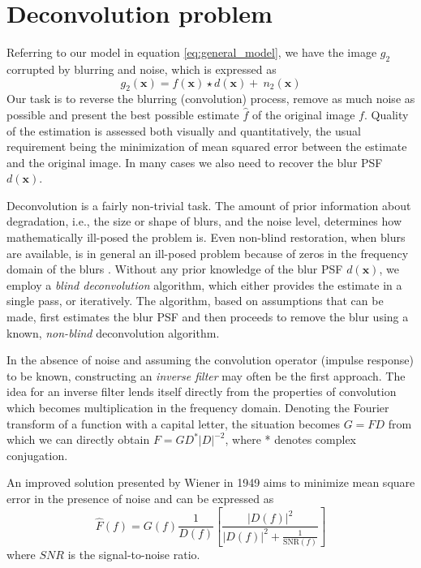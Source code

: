 \documentclass[12pt,notitlepage]{report}
\begin{document}
\section{Deconvolution problem}
\label{sec:the_deconvolution_problem}

Referring to our model in equation \ref{eq:general_model}, we have the image $g_2$ corrupted by blurring and noise, which is expressed as 
\begin{equation}
	\label{eq:deconvolution_problem}
		g_2(\mathbf{x}) = f(\mathbf{x}) \star d(\mathbf{x}) + \ n_2(\mathbf{x}) 
\end{equation}
Our task is to reverse the blurring (convolution) process, remove as much noise as possible and present the best possible estimate $\hat{f}$ of the original image $f$. Quality of the estimation is assessed both visually and quantitatively, the usual requirement being the minimization of mean squared error between the estimate and the original image. In many cases we also need to recover the blur PSF $d(\mathbf{x})$. 

Deconvolution is a fairly non-trivial task. The amount of prior information about degradation, i.e., the size or shape of blurs, and the noise level, determines how mathematically ill-posed the problem is. 
Even non-blind restoration, when blurs are available, is in general an ill-posed problem because of zeros in the frequency domain of the blurs \cite{srou03}. Without any prior knowledge of the blur PSF $d(\mathbf{x})$, we employ a {\em blind deconvolution} algorithm,  which either provides the estimate in a single pass, or iteratively. The algorithm, based on assumptions that can be made, first estimates the blur PSF and then proceeds to remove the blur using a known, {\em non-blind} deconvolution algorithm.  

In the absence of noise and assuming the convolution operator (impulse response) to be known, constructing an {\em inverse filter} may often be the first approach. The idea for an inverse filter lends itself directly from the properties of convolution which becomes multiplication in the frequency domain. Denoting the Fourier transform of a function with a capital letter, the situation becomes $G = FD$ from which we can directly obtain $F = GD^{*}|D|^{-2}$, where * denotes complex conjugation. 

An improved solution presented by Wiener in 1949 aims to minimize mean square error in the presence of noise and can be expressed as 
\begin{equation}
	\label{eq:wiener_deconvolution}
		\hat{F}(f) = G(f) \frac{1}{D(f)} \left[ \frac{ |D(f)|^2 }{ |D(f)|^2 + \frac{1}{\mathrm{SNR}(f)}} \right]
\end{equation}
where $SNR$ is the signal-to-noise ratio. 
\end{document}
